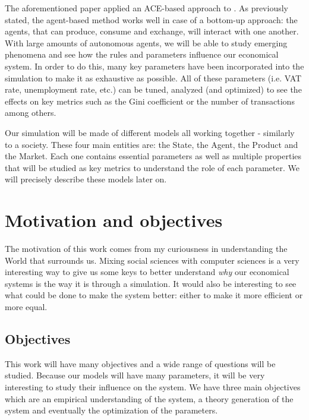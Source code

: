 The aforementioned paper applied an ACE-based approach to . As previously stated, the agent-based method works well in case of a bottom-up approach: the agents, that can  produce, consume and exchange, will interact with one another. With large amounts of autonomous agents, we will be able to study emerging phenomena and see how the rules and parameters influence our economical system. In order to do this, many key parameters have been incorporated into the simulation to make it as exhaustive as possible. All of these parameters (i.e. VAT rate, unemployment rate, etc.) can be tuned, analyzed (and optimized) to see the effects on key metrics such as the Gini coefficient or the number of transactions among others. 

Our simulation will be made of different models all working together - similarly to a society. These four main entities are: the State, the Agent, the Product and the Market. Each one contains essential parameters as well as multiple properties that will be studied as key metrics to understand the role of each parameter. We will precisely describe these models later on.


\section{Motivation and objectives}\label{section:motivation_objectives}

The motivation of this work comes from my curiousness in understanding the World that surrounds us. Mixing social sciences with computer sciences is a very interesting way to give us some keys to better understand \emph{why} our economical systems is the way it is through a simulation. It would also be interesting to see what could be done to make the system better: either to make it more efficient or more equal.

\subsection{Objectives}

This work will have many objectives and a wide range of questions will be studied. Because our models will have many parameters, it will be very interesting to study their influence on the system. We have three main objectives which are an empirical understanding of the system, a theory generation of the system \cite{tesfatsion_handbook} and eventually the optimization of the parameters.

